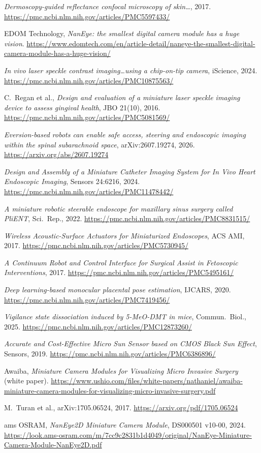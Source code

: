 \documentclass[11pt,a4paper]{article}
\begin{document}
\begin{small}
\begin{enumerate}[label={[S\arabic*]}, leftmargin=2.6em, itemsep=1pt]
  \item \emph{Dermoscopy-guided reflectance confocal microscopy of skin\ldots}, 2017. \url{https://pmc.ncbi.nlm.nih.gov/articles/PMC5597433/}
  \item EDOM Technology, \emph{NanEye: the smallest digital camera module has a huge vision}. \url{https://www.edomtech.com/en/article-detail/naneye-the-smallest-digital-camera-module-has-a-huge-vision/}
  \item \emph{In vivo laser speckle contrast imaging\ldots using a chip-on-tip camera}, iScience, 2024. \url{https://pmc.ncbi.nlm.nih.gov/articles/PMC10875563/}
  \item C.~Regan et al., \emph{Design and evaluation of a miniature laser speckle imaging device to assess gingival health}, JBO 21(10), 2016. \url{https://pmc.ncbi.nlm.nih.gov/articles/PMC5081569/}
  \item \emph{Eversion-based robots can enable safe access, steering and endoscopic imaging within the spinal subarachnoid space}, arXiv:2607.19274, 2026. \url{https://arxiv.org/abs/2607.19274}
  \item \emph{Design and Assembly of a Miniature Catheter Imaging System for In Vivo Heart Endoscopic Imaging}, Sensors 24:6216, 2024. \url{https://pmc.ncbi.nlm.nih.gov/articles/PMC11478442/}
  \item \emph{A miniature robotic steerable endoscope for maxillary sinus surgery called PliENT}, Sci.~Rep., 2022. \url{https://pmc.ncbi.nlm.nih.gov/articles/PMC8831515/}
  \item \emph{Wireless Acoustic-Surface Actuators for Miniaturized Endoscopes}, ACS AMI, 2017. \url{https://pmc.ncbi.nlm.nih.gov/articles/PMC5730945/}
  \item \emph{A Continuum Robot and Control Interface for Surgical Assist in Fetoscopic Interventions}, 2017. \url{https://pmc.ncbi.nlm.nih.gov/articles/PMC5495161/}
  \item \emph{Deep learning-based monocular placental pose estimation}, IJCARS, 2020. \url{https://pmc.ncbi.nlm.nih.gov/articles/PMC7419456/}
  \item \emph{Vigilance state dissociation induced by 5-MeO-DMT in mice}, Commun.~Biol., 2025. \url{https://pmc.ncbi.nlm.nih.gov/articles/PMC12873260/}
  \item \emph{Accurate and Cost-Effective Micro Sun Sensor based on CMOS Black Sun Effect}, Sensors, 2019. \url{https://pmc.ncbi.nlm.nih.gov/articles/PMC6386896/}
  \item Awaiba, \emph{Miniature Camera Modules for Visualizing Micro Invasive Surgery} (white paper). \url{https://www.ushio.com/files/white-papers/nathaniel/awaiba-miniature-camera-modules-for-visualizing-micro-invasive-surgery.pdf}
  \item M.~Turan et al., arXiv:1705.06524, 2017. \url{https://arxiv.org/pdf/1705.06524}
  \item ams OSRAM, \emph{NanEye2D Miniature Camera Module}, DS000501 v10-00, 2024. \url{https://look.ams-osram.com/m/7cc9c2831b1d4049/original/NanEye-Miniature-Camera-Module-NanEye2D.pdf}
\end{enumerate}
\end{small}
\end{document}
